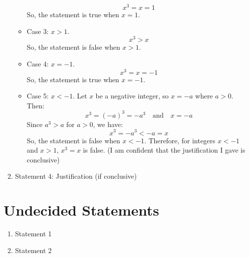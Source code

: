\documentclass{article}
\begin{document}
\begin{enumerate}
\begin{itemize}
                    \[
                        x^3 = x = 1
                    \]
                    So, the statement is true when $x = 1$.
              \item Case 3: $x > 1$.
                    \[
                        x^3 > x
                    \]
                    So, the statement is false when $x > 1$.
              \item Case 4: $x = -1$.
                    \[
                        x^3 = x = -1
                    \]
                    So, the statement is true when $x = -1$.
              \item Case 5: $x < -1$.
                    Let \(x\) be a negative integer, so \(x = -a\) where \(a > 0\).
                    Then:
                    \[
                        x^3 = {(-a)}^3 = -a^3 \quad \text{and} \quad x = -a
                    \]
                    Since \(a^3 > a\) for \(a > 0\), we have:
                    \[
                        x^3 = -a^3 < -a = x
                    \]
                    So, the statement is false when $x < -1$.\newline
                    Therefore, for integers \(x < -1\) and \(x > 1\), \(x^3 = x\) is false.\newline
                    (I am confident that the justification I gave is conclusive)
          \end{itemize}
    \item Statement 4: Justification (if conclusive)
\end{enumerate}

\section{Undecided Statements}

\begin{enumerate}
    \item Statement 1
    \item Statement 2
\end{enumerate}
\end{document}
